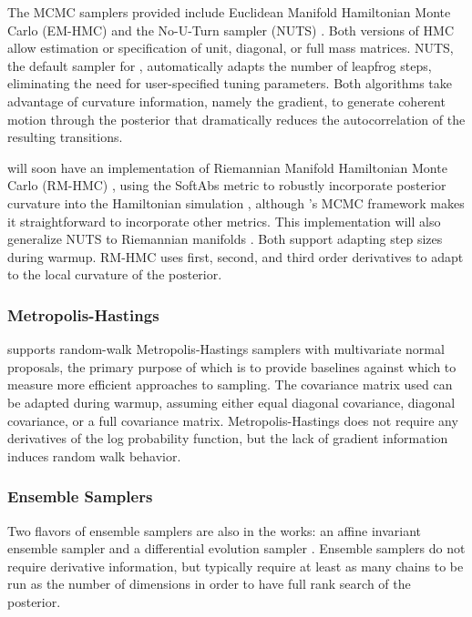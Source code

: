 \documentclass[article]{jss}
\begin{document}
The MCMC samplers provided include Euclidean Manifold Hamiltonian
Monte Carlo (EM-HMC) \citep{DuaneEtAl:1987, Neal:1994, Neal:2011} and
the No-U-Turn sampler (NUTS) \citep{HoffmanGelman:2011}.  Both
versions of HMC allow estimation or specification of unit, diagonal,
or full mass matrices.  NUTS, the default sampler for ,
automatically adapts the number of leapfrog steps, eliminating the 
need for user-specified tuning parameters.  Both algorithms take advantage
of curvature information, namely the gradient, to generate coherent motion
through the posterior that dramatically reduces the autocorrelation of
the resulting transitions.

 will soon have an implementation of Riemannian Manifold
Hamiltonian Monte Carlo (RM-HMC) \citep{GirolamiCalderhead:2011},
using the SoftAbs metric to robustly incorporate posterior curvature
into the Hamiltonian simulation \cite{Betancourt:2012}, although
's MCMC framework makes it
straightforward to incorporate other metrics.  This
implementation will also generalize NUTS to Riemannian manifolds
\citep{Betancourt:2013}.  Both support adapting step sizes during
warmup.  RM-HMC uses first, second, and third order derivatives 
to adapt to the local curvature of the posterior.

\subsubsection{Metropolis-Hastings}

 supports random-walk Metropolis-Hastings samplers with
multivariate normal proposals, the primary purpose of which is to
provide baselines against which to measure more efficient approaches
to sampling.  The covariance matrix used can be adapted during warmup,
assuming either equal diagonal covariance, diagonal covariance, or a
full covariance matrix.  Metropolis-Hastings does not require any
derivatives of the log probability function, but the lack of gradient
information induces random walk behavior.


\subsubsection{Ensemble Samplers}

Two flavors of ensemble samplers are also in the works: an affine invariant
ensemble sampler \citep{GoodmanWeare:2010} and a differential
evolution sampler \cite{TerBraak:2006}.  Ensemble samplers do not
require derivative information, but typically require at least as many
chains to be run as the number of dimensions in order to have full
rank search of the posterior.
\end{document}
